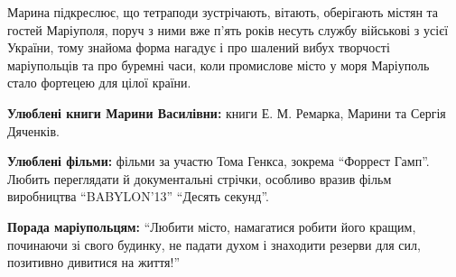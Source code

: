 Марина підкреслює, що тетраподи зустрічають, вітають, оберігають містян та
гостей Маріуполя, поруч з ними вже п'ять років несуть службу військові з усієї
України, тому знайома форма нагадує і про шалений вибух творчості маріупольців
та про буремні часи, коли  промислове місто у моря Маріуполь стало фортецею для
цілої країни.

\textbf{Улюблені книги Марини Василівни:} книги Е. М. Ремарка, Марини та Сергія
Дяченків.

\textbf{Улюблені фільми:} фільми за участю Тома Генкса, зокрема \enquote{Форрест Гамп}.
Любить переглядати й документальні стрічки, особливо вразив фільм виробництва
\enquote{BABYLON'13} \enquote{Десять секунд}.

\textbf{Порада маріупольцям:} \enquote{Любити місто, намагатися робити його кращим, починаючи зі
свого будинку, не падати духом і знаходити резерви для сил, позитивно дивитися
на життя!}

